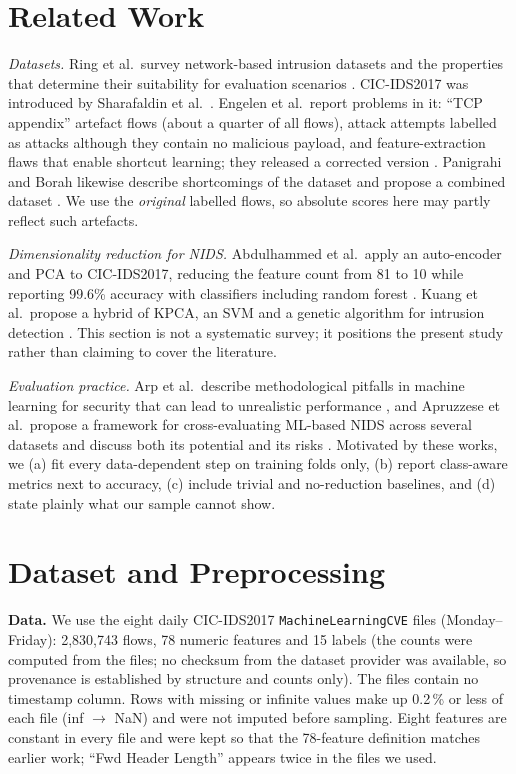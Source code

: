 \documentclass[conference]{IEEEtran}
\begin{document}
\section{Related Work}
\textit{Datasets.} Ring et al.\ survey network-based intrusion datasets and the properties that determine their suitability for evaluation scenarios \cite{ring2019}. CIC-IDS2017 was introduced by Sharafaldin et al.\ \cite{sharafaldin2018}. Engelen et al.\ report problems in it: ``TCP appendix'' artefact flows (about a quarter of all flows), attack attempts labelled as attacks although they contain no malicious payload, and feature-extraction flaws that enable shortcut learning; they released a corrected version \cite{engelen2021}. Panigrahi and Borah likewise describe shortcomings of the dataset and propose a combined dataset \cite{panigrahi2018}. We use the \emph{original} labelled flows, so absolute scores here may partly reflect such artefacts.

\textit{Dimensionality reduction for NIDS.} Abdulhammed et al.\ apply an auto-encoder and PCA to CIC-IDS2017, reducing the feature count from 81 to 10 while reporting 99.6\% accuracy with classifiers including random forest \cite{abdulhammed2019}. Kuang et al.\ propose a hybrid of KPCA, an SVM and a genetic algorithm for intrusion detection \cite{kuang2014}. This section is not a systematic survey; it positions the present study rather than claiming to cover the literature.

\textit{Evaluation practice.} Arp et al.\ describe methodological pitfalls in machine learning for security that can lead to unrealistic performance \cite{arp2022}, and Apruzzese et al.\ propose a framework for cross-evaluating ML-based NIDS across several datasets and discuss both its potential and its risks \cite{apruzzese2022}. Motivated by these works, we (a) fit every data-dependent step on training folds only, (b) report class-aware metrics next to accuracy, (c) include trivial and no-reduction baselines, and (d) state plainly what our sample cannot show.

\section{Dataset and Preprocessing}\label{sec:data}
\textbf{Data.} We use the eight daily CIC-IDS2017 \texttt{MachineLearningCVE} files (Monday--Friday): 2{,}830{,}743 flows, 78 numeric features and 15 labels (the counts were computed from the files; no checksum from the dataset provider was available, so provenance is established by structure and counts only). The files contain no timestamp column. Rows with missing or infinite values make up 0.2\,\% or less of each file (inf $\to$ NaN) and were not imputed before sampling. Eight features are constant in every file and were kept so that the 78-feature definition matches earlier work; ``Fwd Header Length'' appears twice in the files we used.
\end{document}
